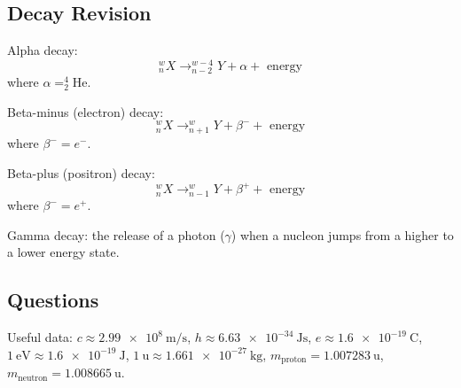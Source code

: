 \documentclass[answers]{exam}
\theoremstyle{definition}
\begin{document}
\subsection*{Decay Revision}
Alpha decay:
\begin{displaymath}
  ^w_n X \rightarrow ^{w - 4}_{n - 2} Y + \alpha + \text{ energy}
\end{displaymath}
where $ \alpha = ^4_2\mathrm{He} $.

Beta-minus (electron) decay:
\begin{displaymath}
  ^w_n X \rightarrow ^{w}_{n + 1} Y + \beta^- + \text{ energy}
\end{displaymath}
where $ \beta^- = e^- $.

Beta-plus (positron) decay:
\begin{displaymath}
  ^w_n X \rightarrow ^{w}_{n - 1} Y + \beta^+ + \text{ energy}
\end{displaymath}
where $ \beta^- = e^+ $.

Gamma decay: the release of a photon ($\gamma$) when a nucleon jumps from a higher to a lower energy state.

\clearpage
\subsection*{Questions}
Useful data: $ c \approx \SI{2.99e8}{\metre\per\second} $, $ h \approx \SI{6.63e-34}{\joule\second} $,
$ e \approx \SI{1.6e-19}{\coulomb} $, $ \SI{1}{\electronvolt} \approx \SI{1.6e-19}{\joule} $, $ \SI{1}{\amu} \approx \SI{1.661e-27}{\kilo\gram} $,
$ m_\text{proton} = \SI{1.007283}{\amu} $, $ m_\text{neutron} = \SI{1.008665}{\amu} $.
\end{document}
